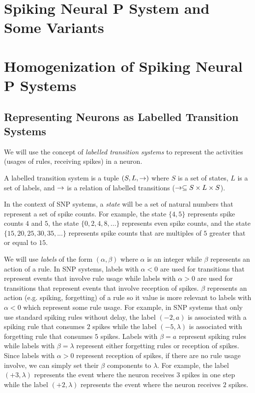 \documentclass[runningheads,a4paper]{llncs}
\begin{document}
\section{Spiking Neural P System and Some Variants} \label{sec-snps}



\section{Homogenization of Spiking Neural P Systems} \label{sec-homo}

\subsection{Representing Neurons as Labelled Transition Systems}

We will use the concept of \emph{labelled transition systems} to represent the activities (usages of
rules, receiving spikes) in a neuron.

\begin{definition}
A labelled transition system is a tuple $(S, L, \rightarrow)$ where $S$ is a set of states, $L$ is a set of
labels, and $\rightarrow$ is a relation of labelled transitions ($\rightarrow \subseteq S \times L \times S$). 
\end{definition}

In the context of SNP systems, a \emph{state} will be a set of natural numbers that represent a set
of spike counts. For example, the state $\{4,5\}$ represents spike counts $4$ and $5$, the state 
$\{0,2,4,8,...\}$ represents even spike counts, and the state $\{15,20,25,30,35,...\}$ represents 
spike counts that are multiples of $5$ greater that or equal to $15$.

We will use \emph{labels} of the form $(\alpha, \beta)$ where $\alpha$ is an integer while $\beta$ 
represents an action of a rule. In SNP systems, labels with $\alpha<0$ are used for transitions that 
represent events that involve rule usage while labels with $\alpha>0$ are used for transitions that 
represent events that involve reception of spikes. $\beta$ represents an action (e.g. spiking, 
forgetting) of a rule so it value is more relevant to labels with $\alpha < 0$ which represent some
rule usage. For example, in SNP systems that only use standard spiking rules without delay, the
label $(-2,a)$ is associated with a spiking rule that consumes $2$ spikes while the label 
$(-5,\lambda)$ is associated with forgetting rule that consumes $5$ spikes. Labels with $\beta = a$ 
represent spiking rules while labels with $\beta=\lambda$ represent either forgetting rules or 
reception of spikes. Since labels with $\alpha > 0$ represent reception of spikes, if there are
no rule usage involve, we can simply set their $\beta$ components to $\lambda$. For example, the 
label $(+3,\lambda)$ represents the event where the neuron receives $3$ spikes in one step while the 
label $(+2,\lambda)$ represents the event where the neuron receives $2$ spikes.
\end{document}
